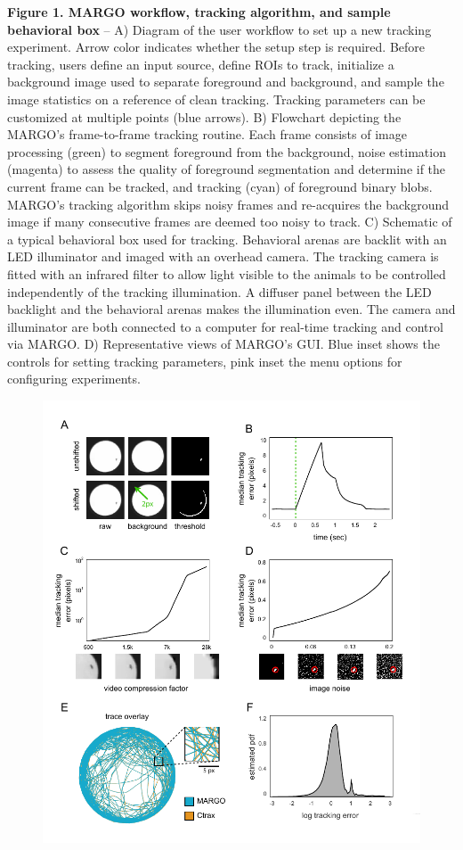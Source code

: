 \documentclass[10pt,letterpaper]{article}
\begin{document}
\clearpage
\textbf{Figure 1. MARGO workflow, tracking algorithm, and sample behavioral box} -- A) Diagram of the user workflow to set up a new tracking experiment. Arrow color indicates whether the setup step is required. Before tracking, users define an input source, define ROIs to track, initialize a background image used to separate foreground and background, and sample the image statistics on a reference of clean tracking. Tracking parameters can be customized at multiple points (blue arrows). B) Flowchart depicting the MARGO's frame-to-frame tracking routine. Each frame consists of image processing (green) to segment foreground from the background, noise estimation (magenta) to assess the quality of foreground segmentation and determine if the current frame can be tracked, and tracking (cyan) of foreground binary blobs. MARGO's tracking algorithm skips noisy frames and re-acquires the background image if many consecutive frames are deemed too noisy to track. C) Schematic of a typical behavioral box used for tracking. Behavioral arenas are backlit with an LED illuminator and imaged with an overhead camera. The tracking camera is fitted with an infrared filter to allow light visible to the animals to be controlled independently of the tracking illumination. A diffuser panel between the LED backlight and the behavioral arenas makes the illumination even. The camera and illuminator are both connected to a computer for real-time tracking and control via MARGO. D) Representative views of MARGO's GUI. Blue inset shows the controls for setting tracking parameters, pink inset the menu options for configuring experiments.

\clearpage
\begin{figure}
 \includegraphics[width=\linewidth]{../../figures/autotracker_performance.pdf}
\end{figure}
\end{document}
